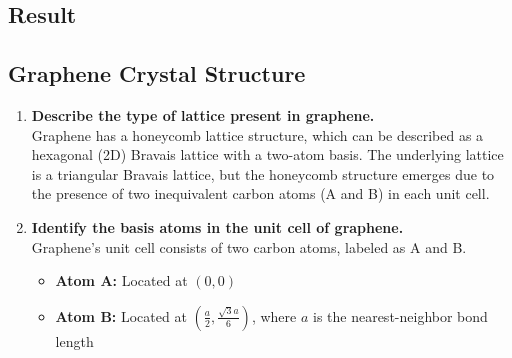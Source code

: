 \documentclass[12pt,a4paper]{article}
\begin{document}
\begin{CJK}{UTF8}{bkai}
\clearpage
\section{Result}\label{sec:result}

\subsection{Graphene Crystal Structure}\label{subsec:result_graphene}

\begin{enumerate}
    \item \textbf{Describe the type of lattice present in graphene.}\\
    Graphene has a honeycomb lattice structure, which can be described as a hexagonal (2D) Bravais lattice with a two-atom basis. The underlying lattice is a triangular Bravais lattice, but the honeycomb structure emerges due to the presence of two inequivalent carbon atoms (A and B) in each unit cell.
    \item \textbf{Identify the basis atoms in the unit cell of graphene.}\\
    Graphene's unit cell consists of two carbon atoms, labeled as A and B.
    \begin{itemize}
        \item \textbf{Atom A:} Located at $\left(0, 0\right)$
        \item \textbf{Atom B:} Located at $\left(\frac{a}{2}, \frac{\sqrt{3}a}{6}\right)$, where $a$ is the nearest-neighbor bond length
    \end{itemize}


\end{enumerate}
\end{CJK}
\end{document}

